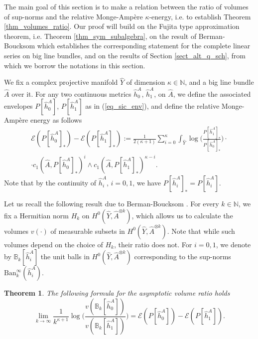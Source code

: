 \documentclass[12pt]{article}
\numberwithin{equation}{section}
\theoremstyle{theorem}
\newtheorem{thm}{Theorem}[section]
\theoremstyle{definition}
\theoremstyle{remark}
\newcommand{\vol}{v}
\newcommand{\nat}{\mathbb{N}}
\begin{document}
	The main goal of this section is to make a relation between the ratio of volumes of sup-norms and the relative Monge-Ampère $\kappa$-energy, i.e. to establish Theorem \ref{thm_volumes_ratio}.
	Our proof will build on the Fujita type approximation theorem, i.e. Theorem \ref{thm_sym_subalgebra}, on the result of Berman-Boucksom \cite{BermanBouckBalls} which establishes the corresponding statement for the complete linear series on big line bundles, and on the results of Section \ref{sect_alt_q_sch}, from which we borrow the notations in this section.
	\par 
	We fix a complex projective manifold $\widehat{Y}$ of dimension $\kappa \in \nat$, and a big line bundle $\widehat{A}$ over it.
	For any two continuous metrics $\widehat{h}^A_0$, $\widehat{h}^A_1$, on $\widehat{A}$, we define the associated envelopes $P[\widehat{h}^A_0]$, $P[\widehat{h}^A_1]$ as in (\ref{eq_sic_env}), and define the relative Monge-Ampère energy as follows
	\begin{multline}\label{eq_diff_energy_a}
		\mathscr{E}(P[\widehat{h}^A_0]_*) - \mathscr{E}(P[\widehat{h}^A_1]_*)
		:=
		\frac{1}{2(\kappa + 1)}
		\sum_{i = 0}^{\kappa} \int_{\widehat{Y}} \log\Big( \frac{P[\widehat{h}^A_1]_*}{P[\widehat{h}^A_0]_*} \Big)
		\cdot
		\\
		 \cdot c_1(\widehat{A}, P[\widehat{h}^A_0]_*)^i \wedge c_1(\widehat{A}, P[\widehat{h}^A_1]_*)^{\kappa - i}.
	\end{multline}
	Note that by the continuity of $\widehat{h}^A_i$, $i = 0, 1$, we have $P[\widehat{h}^A_i]_* = P[\widehat{h}^A_i]$.
	\par 
	Let us recall the following result due to Berman-Boucksom \cite{BermanBouckBalls}.
	For every $k \in \nat$, we fix a Hermitian norm $H_k$ on $H^0(\widehat{Y}, \widehat{A}^{\otimes k})$, which allows us to calculate the volumes $\vol(\cdot)$ of measurable subsets in $H^0(\widehat{Y}, \widehat{A}^{\otimes k})$. 
	Note that while such volumes depend on the choice of $H_k$, their ratio does not.
	For $i = 0, 1$, we denote by $\mathbb{B}_k[\widehat{h}^A_i]$ the unit balls in $H^0(\widehat{Y}, \widehat{A}^{\otimes k})$ corresponding to the sup-norms ${\textrm{Ban}}_k^{\infty}(\widehat{h}^A_i)$.
	\begin{thm}\label{thm_volumes_ratio_bb}
		The following formula for the asymptotic volume ratio holds
		\begin{equation}\label{rem_thm_isom2}
			\lim_{k \to \infty}
			\frac{1}{k^{\kappa + 1}} \log \Big( \frac{\vol(\mathbb{B}_k[\widehat{h}^A_0])}{\vol(\mathbb{B}_k[\widehat{h}^A_1])} \Big)
			=
			\mathscr{E}(P[\widehat{h}^A_0]) - \mathscr{E}(P[\widehat{h}^A_1]).
		\end{equation}
	\end{thm}
\end{document}
